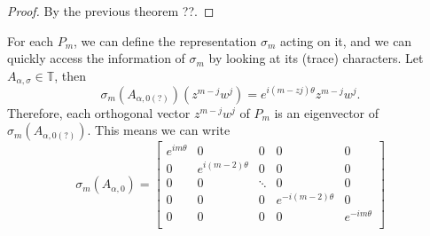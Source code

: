 \documentclass{article}
\begin{document}
\begin{proof}
   By the previous theorem ??. 
\end{proof}

For each $P_m$, we can define the representation $\sigma_m$ acting on it, and we can quickly access the information of $\sigma_m$ by looking at its (trace) characters. Let $A_{\alpha, \sigma} \in \mathbb{T}$, then
\begin{equation}
    \sigma_m(A_{\alpha, 0(?)})(z^{m-j}w^{j}) = e^{i(m-zj)\theta}z^{m-j}w^{j}.
\end{equation}
Therefore, each orthogonal vector $z^{m-j}w^{j}$ of $P_m$ is an eigenvector of $\sigma_m(A_{\alpha, 0(?)})$. This means we can write
\begin{equation}
    \sigma_m(A_{\alpha,0}) =
    \begin{bmatrix} 
        e^{im\theta} & 0  & 0  & 0  & 0  \\
        0 & e^{i(m-2)\theta} &0 &0  &0  \\
        0  &0 & \ddots &0  &0  \\
        0  &0 &0  & e^{-i(m-2)\theta} &0  \\
        0  &0  &0 &0    & e^{-im\theta} \\		
    \end{bmatrix}
\end{equation}
\end{document}
